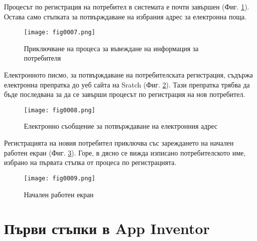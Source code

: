 Процесът по регистрация на потребител в системата е почти завършен (Фиг. \ref{fig0007}). Остава само стъпката за потвърждаване на избрания адрес за електронна поща.

\begin{figure}[H]
  \centering
  \texttt{[image: fig0007.png]}
  \caption{Приключване на процеса за въвеждане на информация за потребителя}
\label{fig0007}
\end{figure}

Електронното писмо, за потвърждаване на потребителската регистрация, съдържа електронна препратка до уеб сайта на Sratch (Фиг. \ref{fig0008}). Тази препратка трябва да бъде последвана за да се завърши процесът по регистрация на нов потребител. 

\begin{figure}[H]
  \centering
  \texttt{[image: fig0008.png]}
  \caption{Електронно съобщение за потвърждаване на електронния адрес}
\label{fig0008}
\end{figure}

Регистрацията на новия потребител приключва със зареждането на начален работен екран (Фиг. \ref{fig0009}). Горе, в дясно се вижда изписано потребителското име, избрано на първата стъпка от процеса по регистрацията.

\begin{figure}[H]
  \centering
  \texttt{[image: fig0009.png]}
  \caption{Начален работен екран}
\label{fig0009}
\end{figure}

\section{Първи стъпки в App Inventor}

